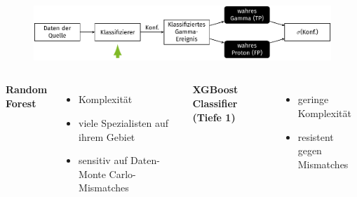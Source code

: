 \documentclass[aspectratio=1610, professionalfonts, 9pt]{beamer}
\begin{document}
\begin{frame}
  \begin{minipage}[t][0.25\textheight][t]{\textwidth}
	\begin{figure}
	  \includegraphics[scale=0.5]{./tikz/Conf/Conf2.pdf}
	\end{figure}
  \end{minipage}
  \begin{minipage}[t][0.10\textheight][t]{\textwidth}
  \end{minipage}
  \begin{minipage}[t][0.65\textheight][t]{\textwidth}
	\begin{columns}[onlytextwidth]
	  \Large \bf Random Forest
	  \begin{itemize}
		\item Komplexität
		\item viele Spezialisten auf ihrem Gebiet
		\item sensitiv auf Daten-Monte Carlo-Mismatches
	  \end{itemize}
	  \Large \bf XGBoost Classifier (Tiefe 1)
	  \begin{itemize}
		\item geringe Komplexität
		\item resistent gegen Mismatches
	  \end{itemize}
	\end{columns}
  \end{minipage}
\end{frame}
\end{document}
